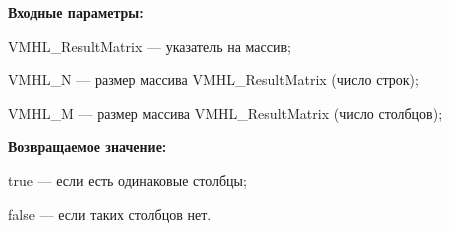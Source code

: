 \textbf{Входные параметры:}
 
VMHL\_ResultMatrix --- указатель на массив;
 
VMHL\_N --- размер массива VMHL\_ResultMatrix (число строк);
 
VMHL\_M --- размер массива VMHL\_ResultMatrix (число столбцов);

\textbf{Возвращаемое значение:}

 true --- если есть одинаковые столбцы;
 
 false --- если таких столбцов нет.